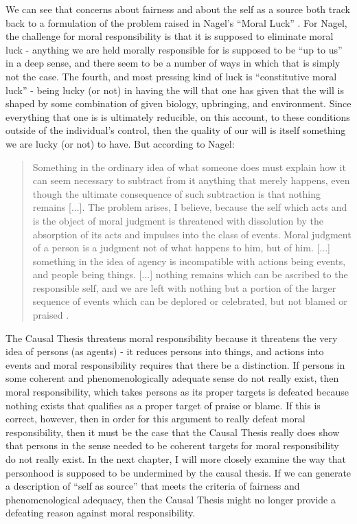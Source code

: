 \documentclass[phd,12pt,oneside,paper=letterpaper]{ubcthesis}
\begin{document}
We can see that concerns about fairness and about the self as a source both track back to a formulation of the problem raised in Nagel's ``Moral Luck'' \citep{nagel1979b}. For Nagel, the challenge for moral responsibility is that it is supposed to eliminate moral luck - anything we are held morally responsible for is supposed to be ``up to us'' in a deep sense, and there seem to be a number of ways in which that is simply not the case. The fourth, and most pressing kind of luck is ``constitutive moral luck'' - being lucky (or not) in having the will that one has given that the will is shaped by some combination of given biology, upbringing, and environment. Since everything that one is is ultimately reducible, on this account, to these conditions outside of the individual's control, then the quality of our will is itself something we are lucky (or not) to have. But according to Nagel:

\begin{quote}
Something in the ordinary idea of what someone does must explain how it can seem necessary to subtract from it anything that merely happens, even though the ultimate consequence of such subtraction is that nothing remains [...]. The problem arises, I believe, because the self which acts and is the object of moral judgment is threatened with dissolution by the absorption of its acts and impulses into the class of events. Moral judgment of a person is a judgment not of what happens to him, but of him. [...] something in the idea of agency is incompatible with actions being events, and people being things. [...] nothing remains which can be ascribed to the responsible self, and we are left with nothing but a portion of the larger sequence of events which can be deplored or celebrated, but not blamed or praised \citep{nagel1979b}.
\end{quote}

The Causal Thesis threatens moral responsibility because it threatens the very idea of  persons (as agents) - it reduces persons into things, and actions into events and moral responsibility requires that there be a distinction. If persons in some coherent and phenomenologically adequate sense do not really exist, then moral responsibility, which takes persons as its proper targets is defeated because nothing exists that qualifies as a proper target of praise or blame. If this is correct, however, then in order for this argument to really defeat moral responsibility, then it must be the case that the Causal Thesis really does show that persons in the sense needed to be coherent targets for moral responsibility do not really exist. In the next chapter, I will more closely examine the way that personhood is supposed to be undermined by the causal thesis. If we can generate a description of ``self as source'' that meets the criteria of fairness and phenomenological adequacy, then the Causal Thesis might no longer provide a defeating reason against moral responsibility.
\end{document}

